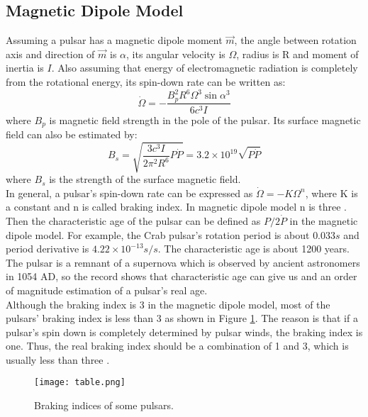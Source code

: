 \documentclass[a4paper, 12pt]{report}
\begin{document}
    \subsection{Magnetic Dipole Model}
      Assuming a pulsar has a magnetic dipole moment $\vec{m}$, the angle between rotation axis and 
      direction of 
      $\vec{m}$ is $\alpha$, its angular velocity is $\Omega$, radius is R and moment of inertia is $I$. 
      Also assuming that energy of electromagnetic radiation is completely from the rotational energy, 
      its spin-down rate can be written as: 
      $$
          \dot{\Omega}=-\frac{B_p^2 R^6 \Omega^3 \sin{\alpha}^3}{6c^3I}
      $$
      where $B_p$ is magnetic field strength in the pole of the pulsar. Its surface magnetic field can 
      also be estimated by:
      $$
          B_s=\sqrt{\frac{3c^3I}{2\pi^2R^6}P\dot{P}}=3.2\times 10^{19}\sqrt{P\dot{P}}
      $$
      where $B_s$ is the strength of the surface magnetic field. \\
      \indent In general, a pulsar's spin-down rate can be expressed as $\dot{\Omega}=-K\Omega^{n}$, 
      where K is a constant and n is called braking index. In magnetic dipole model n is 
      three \cite{Tong2015}. Then the characteristic age of the pulsar can be 
      defined as $P/2\dot{P}$ in the magnetic dipole model. For example, the Crab 
      pulsar's rotation period is about $0.033s$ and period derivative is 
      $4.22\times 10^{-13}s/s$. The characteristic age is about 1200 years. The pulsar 
      is a remnant of a supernova which is observed by ancient astronomers in 1054 
      AD, so the record shows that characteristic age can give us and an order of magnitude 
      estimation of a pulsar's real age. \\
      \indent 
      Although the braking index is 3 in the magnetic dipole model, most of the pulsars' 
      braking index is less than 3 as shown in Figure \ref{fig:braking_index}. The reason is 
      that if a pulsar's spin down is completely determined by pulsar winds, the braking 
      index is one. Thus, the real braking index should be a combination of 1 and 3, which is usually 
      less than three \cite{PhysRevD.91.063007}.
        
      \begin{figure}[!ht]
        \centering
        \texttt{[image: table.png]}
        \caption{Braking indices of some pulsars.}
        \label{fig:braking_index}
      \end{figure}
  
\end{document}
